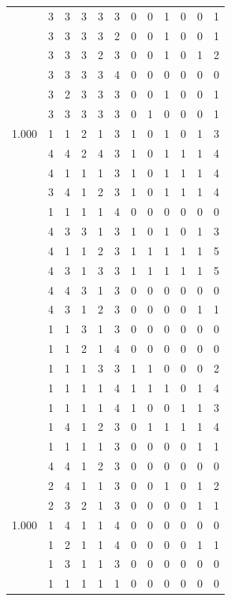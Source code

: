 \documentclass[]{book}
\theoremstyle{definition}
\theoremstyle{definition}
\theoremstyle{definition}
\theoremstyle{remark}
\begin{document}
\begin{table}
{\begin{tabular}[t]{rrrrrrrrrrrr}
 & 3 & 3 & 3 & 3 & 3 & 0 & 0 & 1 & 0 & 0 & 1\\
 & 3 & 3 & 3 & 3 & 2 & 0 & 0 & 1 & 0 & 0 & 1\\
 & 3 & 3 & 3 & 2 & 3 & 0 & 0 & 1 & 0 & 1 & 2\\
 & 3 & 3 & 3 & 3 & 4 & 0 & 0 & 0 & 0 & 0 & 0\\
 & 3 & 2 & 3 & 3 & 3 & 0 & 0 & 1 & 0 & 0 & 1\\
 & 3 & 3 & 3 & 3 & 3 & 0 & 1 & 0 & 0 & 0 & 1\\
1.000 & 1 & 1 & 2 & 1 & 3 & 1 & 0 & 1 & 0 & 1 & 3\\
 & 4 & 4 & 2 & 4 & 3 & 1 & 0 & 1 & 1 & 1 & 4\\
 & 4 & 1 & 1 & 1 & 3 & 1 & 0 & 1 & 1 & 1 & 4\\
 & 3 & 4 & 1 & 2 & 3 & 1 & 0 & 1 & 1 & 1 & 4\\
 & 1 & 1 & 1 & 1 & 4 & 0 & 0 & 0 & 0 & 0 & 0\\
 & 4 & 3 & 3 & 1 & 3 & 1 & 0 & 1 & 0 & 1 & 3\\
 & 4 & 1 & 1 & 2 & 3 & 1 & 1 & 1 & 1 & 1 & 5\\
 & 4 & 3 & 1 & 3 & 3 & 1 & 1 & 1 & 1 & 1 & 5\\
 & 4 & 4 & 3 & 1 & 3 & 0 & 0 & 0 & 0 & 0 & 0\\
 & 4 & 3 & 1 & 2 & 3 & 0 & 0 & 0 & 0 & 1 & 1\\
 & 1 & 1 & 3 & 1 & 3 & 0 & 0 & 0 & 0 & 0 & 0\\
 & 1 & 1 & 2 & 1 & 4 & 0 & 0 & 0 & 0 & 0 & 0\\
 & 1 & 1 & 1 & 3 & 3 & 1 & 1 & 0 & 0 & 0 & 2\\
 & 1 & 1 & 1 & 1 & 4 & 1 & 1 & 1 & 0 & 1 & 4\\
 & 1 & 1 & 1 & 1 & 4 & 1 & 0 & 0 & 1 & 1 & 3\\
 & 1 & 4 & 1 & 2 & 3 & 0 & 1 & 1 & 1 & 1 & 4\\
 & 1 & 1 & 1 & 1 & 3 & 0 & 0 & 0 & 0 & 1 & 1\\
 & 4 & 4 & 1 & 2 & 3 & 0 & 0 & 0 & 0 & 0 & 0\\
 & 2 & 4 & 1 & 1 & 3 & 0 & 0 & 1 & 0 & 1 & 2\\
 & 2 & 3 & 2 & 1 & 3 & 0 & 0 & 0 & 0 & 1 & 1\\
1.000 & 1 & 4 & 1 & 1 & 4 & 0 & 0 & 0 & 0 & 0 & 0\\
 & 1 & 2 & 1 & 1 & 4 & 0 & 0 & 0 & 0 & 1 & 1\\
 & 1 & 3 & 1 & 1 & 3 & 0 & 0 & 0 & 0 & 0 & 0\\
 & 1 & 1 & 1 & 1 & 1 & 0 & 0 & 0 & 0 & 0 & 0\\

\end{tabular}}
\end{table}
\end{document}
